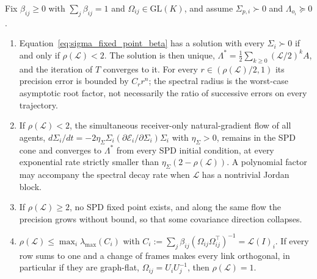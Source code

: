\begin{proposition}
\label{prop:covariance_fixed_point}
Fix $\beta_{ij}\geq0$ with $\sum_j\beta_{ij}=1$ and $\Omega_{ij}\in\mathrm{GL}(K)$, and assume $\Sigma_{p,i} \succ 0$ and $\Lambda_{o_i} \succeq 0$.
\begin{enumerate}
\item[(i)] Equation~\eqref{eq:sigma_fixed_point_beta} has a solution with every $\Sigma_i \succ 0$ if and only if $\rho(\mathcal{L}) < 2$. The solution is then unique, $\Lambda^* = \tfrac{1}{2}\sum_{k \geq 0}(\mathcal{L}/2)^k A$, and the iteration of $T$ converges to it. For every $r\in(\rho(\mathcal L)/2,1)$ its precision error is bounded by $C_r r^n$; the spectral radius is the worst-case asymptotic root factor, not necessarily the ratio of successive errors on every trajectory.
\item[(ii)] If $\rho(\mathcal{L}) < 2$, the simultaneous receiver-only natural-gradient flow of all agents, $d\Sigma_i/dt = -2\eta_\Sigma\Sigma_i(\partial\mathcal{E}_i/\partial\Sigma_i)\Sigma_i$ with $\eta_\Sigma > 0$, remains in the SPD cone and converges to $\Lambda^*$ from every SPD initial condition, at every exponential rate strictly smaller than $\eta_\Sigma(2-\rho(\mathcal L))$. A polynomial factor may accompany the spectral decay rate when $\mathcal L$ has a nontrivial Jordan block.
\item[(iii)] If $\rho(\mathcal{L}) \geq 2$, no SPD fixed point exists, and along the same flow the precision grows without bound, so that some covariance direction collapses.
\item[(iv)] $\rho(\mathcal{L}) \leq \max_i\lambda_{\max}(C_i)$ with $C_i := \sum_j\beta_{ij}(\Omega_{ij}\Omega_{ij}^\top)^{-1} = \mathcal{L}(I)_i$. If every row sums to one and a change of frames makes every link orthogonal, in particular if they are graph-flat, $\Omega_{ij} = U_iU_j^{-1}$, then $\rho(\mathcal{L}) = 1$.
\end{enumerate}
\end{proposition}

